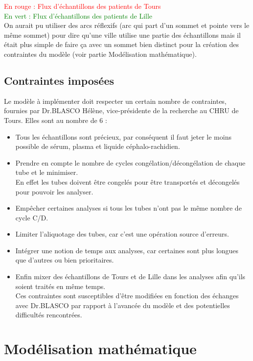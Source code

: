 \documentclass{polytech/polytech}
\numberwithin{figure}{chapter}
\begin{document}
\textcolor{red}{En rouge : Flux d'échantillons des patients de Tours}\\
\textcolor{green}{En vert : Flux d'échantillons des patients de Lille}\\

On aurait pu utiliser des arcs réflexifs (arc qui part d'un sommet et pointe vers le même sommet) pour dire qu'une ville utilise une partie des échantillons mais il était plus simple de faire ça avec un sommet bien distinct pour la création des contraintes du modèle (voir partie Modélisation mathématique).

\subsection{Contraintes imposées}
Le modèle à implémenter doit respecter un certain nombre de contraintes, fournies par Dr.BLASCO Hélène, vice-présidente de la recherche au CHRU de Tours.
Elles sont au nombre de 6 :
\begin{itemize}
	\item Tous les échantillons sont précieux, par conséquent il faut jeter le moins possible de sérum, plasma et liquide céphalo-rachidien.
	\item Prendre en compte le nombre de cycles congélation/décongélation de chaque tube et le minimiser. \\En effet les tubes doivent être congelés pour être transportés et décongelés pour pouvoir les analyser.
	\item Empêcher certaines analyses si tous les tubes n'ont pas le même nombre de cycle C/D.
	\item Limiter l'\gls{aliquotage} des tubes, car c'est une opération source d'erreurs.
	\item Intégrer une notion de temps aux analyses, car certaines sont plus longues que d'autres ou bien prioritaires.
	\item Enfin mixer des échantillons de Tours et de Lille dans les analyses afin qu'ils soient traités en même temps.\\

Ces contraintes sont susceptibles d'être modifiées en fonction des échanges avec Dr.BLASCO par rapport à l'avancée du modèle et des potentielles difficultés rencontrées.
\end{itemize}
\pagebreak

\section{Modélisation mathématique}
\end{document}
